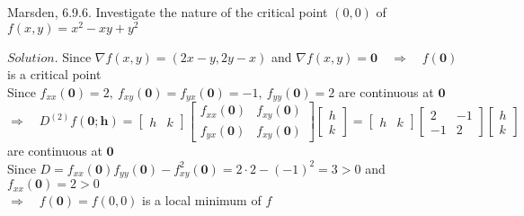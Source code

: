 \documentclass[12pt]{book}
\begin{document}
\begin{CJK}{UTF8}{bsmi}
Marsden, 6.9.6. Investigate the nature of the critical point $(0, 0)$ of $f(x, y)=x^2-xy+y^2$ 

$Solution$. Since $\nabla f(x, y) = (2x-y, 2y-x)$ and $\nabla f(x, y)=\mathbf{0}\quad\Rightarrow\quad f(\mathbf{0})$ is a critical point \\
Since $f_{xx}(\mathbf{0})=2,\ f_{xy}(\mathbf{0})=f_{yx}(\mathbf{0})=-1,\ f_{yy}(\mathbf{0})=2$ are continuous at $\mathbf{0}$ \\[5pt]
$\Rightarrow\quad D^{(2)}f(\mathbf{0};\mathbf{h})
=\begin{bmatrix}h & k\end{bmatrix}
\begin{bmatrix}f_{xx}(\mathbf{0}) & f_{xy}(\mathbf{0}) \\
f_{yx}(\mathbf{0}) & f_{xy}(\mathbf{0})\end{bmatrix}
\begin{bmatrix}h \\ k\end{bmatrix}
=\begin{bmatrix}h & k\end{bmatrix}
\begin{bmatrix} 2 & -1 \\ -1 & 2 \end{bmatrix}
\begin{bmatrix}h \\ k\end{bmatrix}$ are continuous at $\mathbf{0}$ \\[5pt]
Since $D=f_{xx}(\mathbf{0})f_{yy}(\mathbf{0})-f^2_{xy}(\mathbf{0})=2\cdot2-(-1)^2=3>0$ and $f_{xx}(\mathbf{0})=2>0$ \\
$\Rightarrow\quad f(\mathbf{0})=f(0, 0)$ is a local minimum of $f$

\end{CJK}
\end{document}
